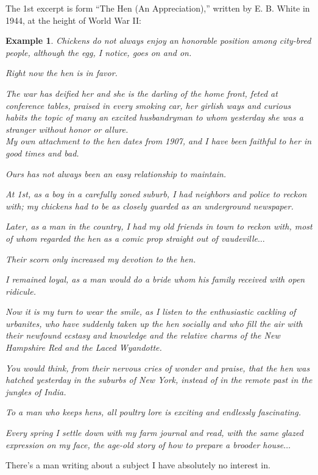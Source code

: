 \documentclass{book}
\numberwithin{equation}{section}
\newtheorem{example}{Example}[chapter]
\begin{document}
The 1st excerpt is form ``The Hen (An Appreciation),'' written by E. B. White in 1944, at the height of World War II:
\begin{example}
    Chickens do not always enjoy an honorable position among city-bred people, although the egg, I notice, goes on and on.
    
    Right now the hen is in favor.
    
    The war has deified her and she is the darling of the home front, feted at conference tables, praised in every smoking car, her girlish ways and curious habits the topic of many an excited husbandryman to whom yesterday she was a stranger without honor or allure.
    \\
    
    My own attachment to the hen dates from 1907, and I have been faithful to her in good times and bad.
    
    Ours has not always been an easy relationship to maintain.
    
    At 1st, as a boy in a carefully zoned suburb, I had neighbors and police to reckon with; my chickens had to be as closely guarded as an underground newspaper.
    
    Later, as a man in the country, I had my old friends in town to reckon with, most of whom regarded the hen as a comic prop straight out of vaudeville$\ldots$
    
    Their scorn only increased my devotion to the hen.
    
    I remained loyal, as a man would do a bride whom his family received with open ridicule.
    
    Now it is my turn to wear the smile, as I listen to the enthusiastic cackling of urbanites, who have suddenly taken up the hen socially and who fill the air with their newfound ecstasy and knowledge and the relative charms of the New Hampshire Red and the Laced Wyandotte.
    
    You would think, from their nervous cries of wonder and praise, that the hen was hatched yesterday in the suburbs of New York, instead of in the remote past in the jungles of India.
    
    To a man who keeps hens, all poultry lore is exciting and endlessly fascinating.
    
    Every spring I settle down with my farm journal and read, with the same glazed expression on my face, the age-old story of how to prepare a brooder house$\ldots$
\end{example}
There's a man writing about a subject I have absolutely no interest in.
\end{document}
